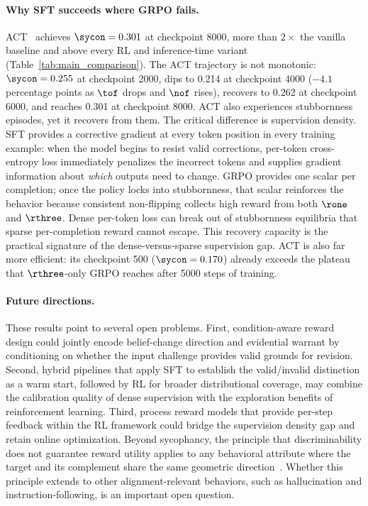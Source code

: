 \paragraph{Why SFT succeeds where GRPO fails.}
ACT~\citep{consistency2025bctact} achieves $\sycon = 0.301$ at checkpoint 8000, more than $2{\times}$ the vanilla baseline and above every RL and inference-time variant (Table~\ref{tab:main_comparison}).
The ACT trajectory is not monotonic: $\sycon = 0.255$ at checkpoint 2000, dips to 0.214 at checkpoint 4000 ($-4.1$ percentage points as $\tof$ drops and $\nof$ rises), recovers to 0.262 at checkpoint 6000, and reaches 0.301 at checkpoint 8000.
ACT also experiences stubbornness episodes, yet it recovers from them.
The critical difference is supervision density.
SFT provides a corrective gradient at every token position in every training example: when the model begins to resist valid corrections, per-token cross-entropy loss immediately penalizes the incorrect tokens and supplies gradient information about \emph{which} outputs need to change.
GRPO provides one scalar per completion; once the policy locks into stubbornness, that scalar reinforces the behavior because consistent non-flipping collects high reward from both $\rone$ and $\rthree$.
Dense per-token loss can break out of stubbornness equilibria that sparse per-completion reward cannot escape.
This recovery capacity is the practical signature of the dense-versus-sparse supervision gap.
ACT is also far more efficient: its checkpoint 500 ($\sycon = 0.170$) already exceeds the plateau that $\rthree$-only GRPO reaches after 5000 steps of training.

\paragraph{Future directions.}
These results point to several open problems.
First, condition-aware reward design could jointly encode belief-change direction and evidential warrant by conditioning on whether the input challenge provides valid grounds for revision.
Second, hybrid pipelines that apply SFT to establish the valid/invalid distinction as a warm start, followed by RL for broader distributional coverage, may combine the calibration quality of dense supervision with the exploration benefits of reinforcement learning.
Third, process reward models that provide per-step feedback within the RL framework could bridge the supervision density gap and retain online optimization.
Beyond sycophancy, the principle that discriminability does not guarantee reward utility applies to any behavioral attribute where the target and its complement share the same geometric direction~\citep{skalse2022hacking}.
Whether this principle extends to other alignment-relevant behaviors, such as hallucination and instruction-following, is an important open question.